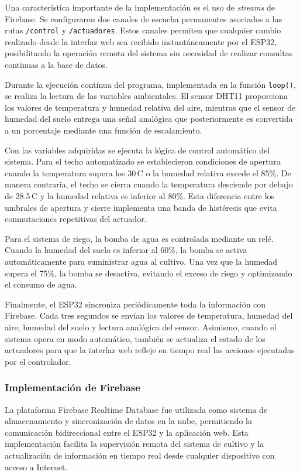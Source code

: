 \documentclass[conference]{IEEEtran}
\begin{document}
Una característica importante de la implementación es el uso de \textit{streams} de Firebase. Se configuraron dos canales de escucha permanentes asociados a las rutas \texttt{/control} y \texttt{/actuadores}. Estos canales permiten que cualquier cambio realizado desde la interfaz web sea recibido instantáneamente por el ESP32, posibilitando la operación remota del sistema sin necesidad de realizar consultas continuas a la base de datos.

Durante la ejecución continua del programa, implementada en la función \texttt{loop()}, se realiza la lectura de las variables ambientales. El sensor DHT11 proporciona los valores de temperatura y humedad relativa del aire, mientras que el sensor de humedad del suelo entrega una señal analógica que posteriormente es convertida a un porcentaje mediante una función de escalamiento.

Con las variables adquiridas se ejecuta la lógica de control automático del sistema. Para el techo automatizado se establecieron condiciones de apertura cuando la temperatura supera los 30\,\textdegree C o la humedad relativa excede el 85\%. De manera contraria, el techo se cierra cuando la temperatura desciende por debajo de 28.5\,\textdegree C y la humedad relativa es inferior al 80\%. Esta diferencia entre los umbrales de apertura y cierre implementa una banda de histéresis que evita conmutaciones repetitivas del actuador.

Para el sistema de riego, la bomba de agua es controlada mediante un relé. Cuando la humedad del suelo es inferior al 60\%, la bomba se activa automáticamente para suministrar agua al cultivo. Una vez que la humedad supera el 75\%, la bomba se desactiva, evitando el exceso de riego y optimizando el consumo de agua.

Finalmente, el ESP32 sincroniza periódicamente toda la información con Firebase. Cada tres segundos se envían los valores de temperatura, humedad del aire, humedad del suelo y lectura analógica del sensor. Asimismo, cuando el sistema opera en modo automático, también se actualiza el estado de los actuadores para que la interfaz web refleje en tiempo real las acciones ejecutadas por el controlador.
\subsubsection{Implementación de Firebase}
La plataforma Firebase Realtime Database fue utilizada como sistema de almacenamiento y sincronización de datos en la nube, permitiendo la comunicación bidireccional entre el ESP32 y la aplicación web. Esta implementación facilita la supervisión remota del sistema de cultivo y la actualización de información en tiempo real desde cualquier dispositivo con acceso a Internet.
\end{document}
